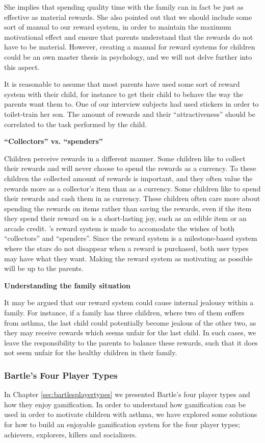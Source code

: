 She implies that spending quality time with the family can in fact be just as effective as material rewards. She also pointed out that we should include some sort of manual to our reward system, in order to maintain the maximum motivational effect and ensure that parents understand that the rewards do not have to be material. However, creating a manual for reward systems for children could be an own master thesis in psychology, and we will not delve further into this aspect. 

It is reasonable to assume that most parents have used some sort of reward system with their child, for instance to get their child to behave the way the parents want them to. One of our interview subjects had used stickers in order to toilet-train her son. The amount of rewards and their ``attractiveness'' should be correlated to the task performed by the child.

\textbf{``Collectors'' vs. ``spenders''}

Children perceive rewards in a different manner. Some children like to collect their rewards and will never choose to spend the rewards as a currency. To these children the collected amount of rewards is important, and they often value the rewards more as a collector's item than as a currency. 
Some children like to spend their rewards and cash them in as currency. These children often care more about spending the rewards on items rather than saving the rewards, even if the item they spend their reward on is a short-lasting joy, such as an edible item or an arcade credit.
\app{}'s reward system is made to accomodate the wishes of both ``collectors'' and ``spenders''. Since the reward system is a milestone-based system where the stars do not disappear when a reward is purchased, both user types may have what they want. Making the reward system as motivating as possible will be up to the parents.

\textbf{Understanding the family situation}

It may be argued that our reward system could cause internal jealousy within a family. For instance, if a family has three children, where two of them suffers from asthma, the last child could potentially become jealous of the other two, as they may receive rewards which seems unfair for the last child. In such cases, we leave the responsibility to the parents to balance these rewards, such that it does not seem unfair for the healthy children in their family.    

\subsubsection{Bartle's Four Player Types}
\label{sec:bartlesfourplayertypes}
In Chapter \ref{sec:bartlesplayertypes} we presented Bartle's four player types and how they enjoy gamification. In order to understand how gamification can be used in order to motivate children with asthma, we have explored some solutions for how to build an enjoyable gamification system for the four player types; achievers, explorers, killers and socializers. 

